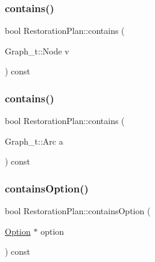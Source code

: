 \subsubsection{\texorpdfstring{contains()}{contains()}\hspace{0.1cm}{\footnotesize\ttfamily [1/2]}}
{\footnotesize\ttfamily bool Restoration\+Plan\+::contains (\begin{DoxyParamCaption}\item[{Graph\+\_\+t\+::\+Node}]{v }\end{DoxyParamCaption}) const}

\mbox{\label{class_restoration_plan_a6ec10a970b2f6cac43a4dbb66232e457}} 
\subsubsection{\texorpdfstring{contains()}{contains()}\hspace{0.1cm}{\footnotesize\ttfamily [2/2]}}
{\footnotesize\ttfamily bool Restoration\+Plan\+::contains (\begin{DoxyParamCaption}\item[{Graph\+\_\+t\+::\+Arc}]{a }\end{DoxyParamCaption}) const}

\mbox{\label{class_restoration_plan_a9f076ad104176e469a5e1e8aecf72614}} 
\subsubsection{\texorpdfstring{contains\+Option()}{containsOption()}}
{\footnotesize\ttfamily bool Restoration\+Plan\+::contains\+Option (\begin{DoxyParamCaption}\item[{\hyperlink{class_restoration_plan_1_1_option}{Option} $\ast$}]{option }\end{DoxyParamCaption}) const}

\mbox{\label{class_restoration_plan_a4bbbe2c593bd9d3de466cf3ea78bf310}} 
